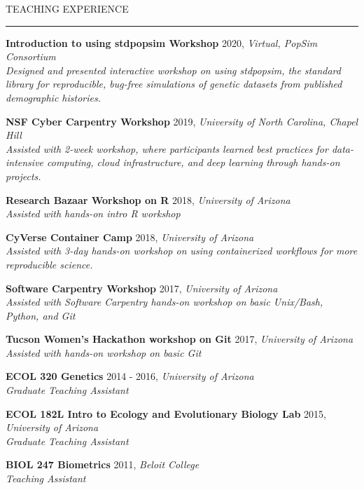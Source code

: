\documentclass{resume} %
\renewenvironment{rSection}[1]{
\sectionskip
\textcolor{RoyalPurple}{\MakeUppercase{#1}}
\sectionlineskip
\hrule
\begin{list}{}{
\setlength{\leftmargin}{1.5em}
}
\item[]
}{
\end{list}
}
\begin{document}
\begin{rSection}{Teaching Experience}

    {\bf Introduction to using stdpopsim Workshop} \hfill 2020, {\em Virtual, PopSim Consortium} \\ 
    {\em Designed and presented interactive workshop on using stdpopsim, the standard library for reproducible, bug-free simulations of genetic datasets from published demographic histories.}

    {\bf NSF Cyber Carpentry Workshop} \hfill 2019, {\em University of North Carolina, Chapel Hill} \\ 
    {\em Assisted with 2-week workshop, where participants learned best practices for data-intensive computing, cloud infrastructure, and deep learning through hands-on projects.}

    {\bf Research Bazaar Workshop on R} \hfill 2018, {\em University of Arizona} \\ 
    {\em Assisted with hands-on intro R workshop}

    {\bf CyVerse Container Camp} \hfill 2018, {\em University of Arizona} \\ 
    {\em Assisted with 3-day hands-on workshop on using containerized workflows for more reproducible science.}

    {\bf Software Carpentry Workshop} \hfill 2017, {\em University of Arizona} \\ 
    {\em Assisted with Software Carpentry hands-on workshop on basic Unix/Bash, Python, and Git}

    {\bf Tucson Women’s Hackathon workshop on Git} \hfill 2017, {\em University of Arizona} \\ 
    {\em Assisted with hands-on workshop on basic Git}

    {\bf ECOL 320 Genetics} \hfill 2014 - 2016, {\em University of Arizona} \\ 
    {\em Graduate Teaching Assistant}

    {\bf ECOL 182L Intro to Ecology and Evolutionary Biology Lab} \hfill 2015, {\em University of Arizona} \\ 
    {\em Graduate Teaching Assistant}

    {\bf BIOL 247 Biometrics} \hfill 2011, {\em Beloit College} \\ 
    {\em Teaching Assistant}

\end{rSection}

\end{document}
